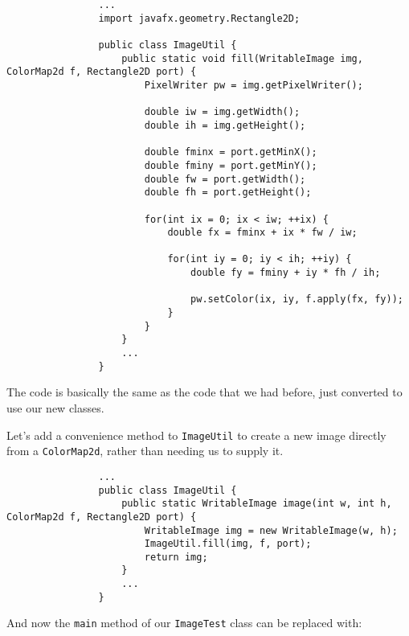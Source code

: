 \documentclass{article}
\begin{document}
            \begin{verbatim}
                ...
                import javafx.geometry.Rectangle2D;
                
                public class ImageUtil {
                    public static void fill(WritableImage img, ColorMap2d f, Rectangle2D port) {
                        PixelWriter pw = img.getPixelWriter();

                        double iw = img.getWidth();
                        double ih = img.getHeight();
        
                        double fminx = port.getMinX();
                        double fminy = port.getMinY();
                        double fw = port.getWidth();
                        double fh = port.getHeight();
        
                        for(int ix = 0; ix < iw; ++ix) {            
                            double fx = fminx + ix * fw / iw;
            
                            for(int iy = 0; iy < ih; ++iy) {
                                double fy = fminy + iy * fh / ih;

                                pw.setColor(ix, iy, f.apply(fx, fy));
                            }
                        }
                    }
                    ...
                }
            \end{verbatim}
            
            The code is basically the same as the code that we had before, just converted to use our new classes.

            Let's add a convenience method to \texttt{ImageUtil} to create a new image directly from a \texttt{ColorMap2d}, rather than
            needing us to supply it.
            
            \begin{verbatim}
                ...
                public class ImageUtil {
                    public static WritableImage image(int w, int h, ColorMap2d f, Rectangle2D port) {
                        WritableImage img = new WritableImage(w, h);
                        ImageUtil.fill(img, f, port);
                        return img;
                    }
                    ...
                }
            \end{verbatim}

            And now the \texttt{main} method of our \texttt{ImageTest} class can be replaced with:
            
\end{document}
